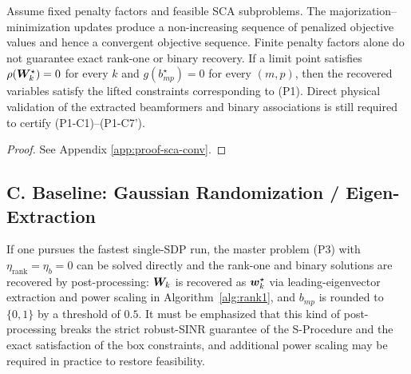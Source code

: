 \begin{theorem}\label{thm:sca-conv}
Assume fixed penalty factors and feasible SCA subproblems. The majorization--minimization updates produce a non-increasing sequence of penalized objective values and hence a convergent objective sequence. Finite penalty factors alone do not guarantee exact rank-one or binary recovery. If a limit point satisfies $\rho(\bm{W}_k^\star)=0$ for every $k$ and $g(b_{mp}^\star)=0$ for every $(m,p)$, then the recovered variables satisfy the lifted constraints corresponding to (P1). Direct physical validation of the extracted beamformers and binary associations is still required to certify (P1-C1)--(P1-C7').
\end{theorem}

\begin{proof}
See Appendix \ref{app:proof-sca-conv}.
\end{proof}

\subsection*{C. Baseline: Gaussian Randomization / Eigen-Extraction}

If one pursues the fastest single-SDP run, the master problem (P3) with $\eta_{\text{rank}} = \eta_b = 0$ can be solved directly and the rank-one and binary solutions are recovered by post-processing: $\bm{W}_k$ is recovered as $\bm{w}_k^\star$ via leading-eigenvector extraction and power scaling in Algorithm~\ref{alg:rank1}, and $b_{mp}$ is rounded to $\{0,1\}$ by a threshold of $0.5$. It must be emphasized that this kind of post-processing breaks the strict robust-SINR guarantee of the S-Procedure and the exact satisfaction of the box constraints, and additional power scaling may be required in practice to restore feasibility.


